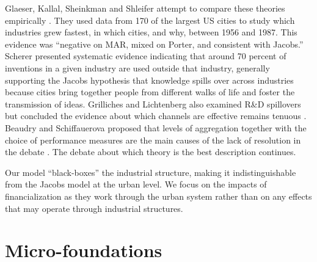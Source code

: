  Glaeser, Kallal, Sheinkman and Shleifer attempt to compare these theories empirically \cite{glaeserGrowthCities1991}. They used data from 170 of the largest US cities to study which industries grew fastest, in which cities, and why, between 1956 and 1987. %
This evidence was ``negative on MAR, mixed on Porter, and consistent with Jacobs.'' Scherer \cite{schererInterindustryTechnologyFlows1982} presented systematic evidence indicating that around 70 percent of inventions in a given industry are used outside that industry, generally supporting the Jacobs hypothesis that knowledge spills over across industries because cities bring together people from different walks of life and foster the transmission of ideas. Grilliches and Lichtenberg also examined R\&D spillovers but concluded the evidence about which channels are effective remains tenuous \cite{grilichesInterindustryTechnologyFlows1984}. Beaudry and Schiffauerova proposed that levels of aggregation together with the choice of performance measures are the main causes of the lack of resolution in the debate \cite{beaudryWhoRightMarshall2009}. The debate about which theory is the best description continues. 


Our model ``black-boxes'' the industrial structure, making it indistinguishable from the Jacobs model at the urban level. We focus on the impacts of financialization as they work through the urban system rather than on any effects that may operate through industrial structures.


\section{Micro-foundations} %

